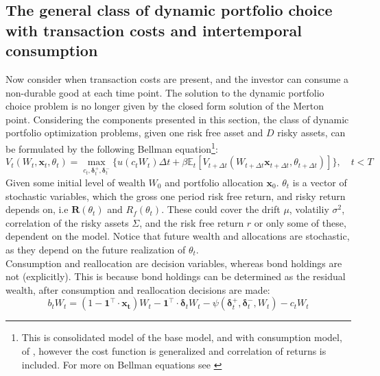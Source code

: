 \documentclass[11pt]{article}
\begin{document}
\subsection{The general class of dynamic portfolio choice with transaction costs and intertemporal consumption} \label{Subsection: Dynamic-portfolio-choice}
Now consider when transaction costs are present, and the investor can consume a non-durable good at each time point.
The solution to the dynamic portfolio choice problem is no longer given by the closed form solution of the Merton point.
Considering the components presented in this section,
the class of dynamic portfolio optimization problems, given one risk free asset and $D$ risky assets, can be formulated 
by the following Bellman equation\footnote{This is consolidated model of the base model, and with consumption model, of \autocite{CaiJuddXu2020},
however the cost function is generalized and correlation of returns is included. For more on Bellman equations see \autocite{Bellman1958}}:
\begin{equation} \label{eq: class_bellman_non_normalized}
  V_{t} (W_t , \mathbf{x}_{t}, \theta_t) = \max_{c_t , \boldsymbol{\delta}^{+}_{t}, \boldsymbol{\delta}^{-}_{t}  } \{ u(c_t W_t ) 
  \Delta t + \beta \mathbb{E}_{t} \left[ 
    V_{t+\Delta t} (W_{t+\Delta t } \mathbf{x}_{t+\Delta t }, \theta_{t + \Delta t }  ) 
    \right] \}, \quad t < T 
\end{equation}
Given some initial level of wealth $W_0$ and portfolio allocation $\mathbf{x}_0$. \( \theta_t \) is a vector of stochastic variables, which
the gross one period risk free return, and risky return depends on, i.e \( \mathbf{R}(\theta_t) \) and \( R_f (\theta_t) \).
These could cover the drift $\mu$, volatiliy $\sigma^{2}$, correlation of the risky assets $\Sigma$, and the risk free return $r$ or only some of these, dependent on the model.
Notice that future wealth and allocations are stochastic, as they depend on the future realization of $\theta_t$.\\
Consumption and reallocation are decision variables, whereas bond holdings are not (explicitly).
This is because bond holdings can be determined as the residual wealth, after consumption and reallocation decisions are made:
\begin{equation}\label{eq: class_bond_holdings_non_normalized}
  b_{t} W_t = \left( 1 - \mathbf{1}^{\top} \cdot \mathbf{x_t}  \right) W_t - \mathbf{1}^{\top} \cdot \boldsymbol{\delta}_t W_t 
  - \psi (\boldsymbol{\delta}^{+}_{t}, \boldsymbol{\delta}^{-}_t , W_t)
  - c_t W_t
\end{equation}
\end{document}
